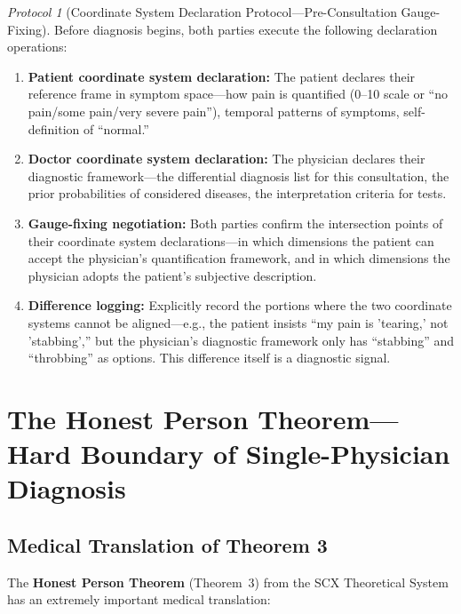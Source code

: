 \documentclass[12pt,a4paper]{article}
\theoremstyle{remark}
\newtheorem{protocol}[theorem]{Protocol}
\begin{document}
\begin{protocol}[Coordinate System Declaration Protocol---Pre-Consultation Gauge-Fixing]\label{prot:coordinate_declaration}
Before diagnosis begins, both parties execute the following declaration operations:
\begin{enumerate}[label=(\arabic*),itemsep=3pt]
    \item \textbf{Patient coordinate system declaration:} The patient declares their reference frame in symptom space---how pain is quantified (0--10 scale or ``no pain/some pain/very severe pain''), temporal patterns of symptoms, self-definition of ``normal.''
    \item \textbf{Doctor coordinate system declaration:} The physician declares their diagnostic framework---the differential diagnosis list for this consultation, the prior probabilities of considered diseases, the interpretation criteria for tests.
    \item \textbf{Gauge-fixing negotiation:} Both parties confirm the intersection points of their coordinate system declarations---in which dimensions the patient can accept the physician's quantification framework, and in which dimensions the physician adopts the patient's subjective description.
    \item \textbf{Difference logging:} Explicitly record the portions where the two coordinate systems cannot be aligned---e.g., the patient insists ``my pain is 'tearing,' not 'stabbing','' but the physician's diagnostic framework only has ``stabbing'' and ``throbbing'' as options. This difference itself is a diagnostic signal.
\end{enumerate}
\end{protocol}

\section{The Honest Person Theorem---Hard Boundary of Single-Physician Diagnosis}
\label{sec:honest_person_medicine}

\subsection{Medical Translation of Theorem 3}

The \textbf{Honest Person Theorem} (Theorem~3) from the SCX Theoretical System has an extremely important medical translation:
\end{document}
